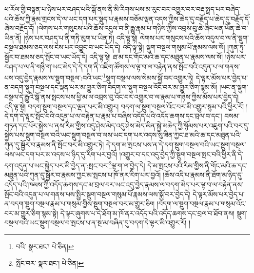 ཕ་རོལ་གྱི་བསྟན་པ་ཉེས་པར་བཤད་པའི་སྒོ་ནས་ནི་མི་རིགས་པས་མ་རུང་བར་འགྱུར་བར་བརྡ་སྤྲད་པར་བཞེད་པའི་ཆོས་ཀྱི་རྣམ་གྲངས་དེ་ལ་ཡང་དག་པར་སྡུད་པ་རྣམས་བཅོམ་ལྡན་འདས་ཀྱིས་ཆེད་དུ་བརྗོད་པ་ཆེད་དུ་བརྗོད་དོ་ཞེས་བརྗོད་དོ། །ལེགས་པར་གསུངས་པའི་ཆོས་འདུལ་བ་ནི་རྒྱུ་རྣམ་པ་གཉིས་ཀྱིས་འབྲས་བུ་ཆེ་ཞིང་ཕན་ཡོན་ཆེ་བ་ཡིན་ནོ། །ཉེས་པར་བཤད་པ་ནི་གཏི་མུག་པ་ཡིན་ཏེ། འདི་ལྟ་སྟེ། ལེགས་པར་གསུངས་པའི་ཆོས་འདུལ་བ་ལ་ནི་སྡུག་བསྔལ་ཐམས་ཅད་ལས་ངེས་པར་འབྱུང་བ་ཡང་ཡོད་དེ། འདི་ལྟ་སྟེ། སྡུག་བསྔལ་གསུམ་པོ་རྣམས་ལས་སོ། །ཀུན་ཏུ་སྦྱོར་བ་ཐམས་ཅད་སྤོང་བ་ཡང་ཡོད་དེ། འདི་ལྟ་སྟེ། ཐ་མ་དང་གོང་མའི་ཆ་དང་མཐུན་པ་རྣམས་ལས་སོ། །ཉེས་པར་བཤད་པ་ལ་ནི་གཉི་ག་ཡང་མེད་དེ་དེ་དག་ནི་འཇིག་ཚོགས་ལ་ལྟ་བ་ལ་བརྟེན་ནས་སྤོང་བའི་འདུན་པ་ལ་གནས་པས་འདུ་བྱེད་རྣམས་ལ་སྡུག་བསྔལ་:བའི་ཡང་\footnote{བའི་  སྣར་ཐང་།  པེ་ཅིན། }སྡུག་བསྔལ་ལས་སེམས་སྐྱོ་བར་འགྱུར་ཏེ། དེ་ལྟར་མོས་པར་བྱེད་པ་ན་བདག་སྡུག་བསྔལ་དང་ལྡན་པར་མ་གྱུར་ཅིག་བདག་ལ་སྡུག་བསྔལ་འོང་བར་མ་གྱུར་ཅིག་སྙམ་མོ། །ཡང་ན་སྡུག་བསྔལ་དེ་རྒྱུའི་སྒོ་ནས་སྤངས་པས་ཕྱི་མ་ལ་འབྲས་བུ་འོང་བར་འགྱུར་བ་ལ་རྣམ་པ་གཉིས་ཀྱིས་མོས་པར་བྱེད་དེ། འདི་ལྟ་སྟེ། བདག་སྡུག་བསྔལ་དང་ལྡན་པར་མི་འགྱུར། བདག་ལ་སྡུག་བསྔལ་འོང་བར་མི་འགྱུར་སྙམ་པའི་ཕྱིར་རོ། །དེ་དག་དེ་ལྟར་སྤོང་བའི་འདུན་པ་ལ་བརྟེན་པ་རྣམ་པ་བཞིས་འདོད་པའི་འདོད་ཆགས་དང་བྲལ་བ་དང་། བསམ་གཏན་དང་པོར་སྐྱེས་པ་ནས་རིམ་གྱིས་འདུ་ཤེས་མེད་འདུ་ཤེས་མེད་མིན་སྐྱེ་མཆེད་ཀྱི་སྙོམས་པར་འཇུག་པའི་བར་དུ་སྐྱེས་པས་སྡུག་བསྔལ་བའི་ཡང་སྡུག་བསྔལ་བ་ལས་ཡང་དག་པར་འདས་སུ་ཟིན་ཀྱང་ཐ་མའི་ཆ་དང་མཐུན་པའི་ཀུན་དུ་སྦྱོར་བ་རྣམས་ནི་སྤོང་བར་མི་འགྱུར་ཏེ། དེ་དག་མ་སྤངས་པས་ན་དེ་དག་སྡུག་བསྔལ་བའི་ཡང་སྡུག་བསྔལ་ལས་ཡང་དག་པར་མ་འདས་པ་ཉིད་དུ་རིག་པར་བྱའོ། །འགྱུར་བ་དང་འདུ་བྱེད་ཀྱི་སྡུག་བསྔལ་སྤང་བའི་ཕྱིར་ནི་དེ་དག་འདུན་པ་ཡང་སྐྱེད་པར་མི་བྱེད་ན་:སྤང་བར་\footnote{སྤོང་བར་  སྣར་ཐང་།  པེ་ཅིན། }ལྟ་ག་ལ་བྱེད་དེ། དེ་མ་སྤངས་པའི་རིམ་གྱིས་ནི་གོང་མའི་ཆ་དང་མཐུན་པའི་ཀུན་དུ་སྦྱོར་བ་རྣམས་ཀྱང་མ་སྤངས་པ་ཁོ་ནར་རིག་པར་བྱའོ། །ཆོས་འདི་པ་རྣམས་ནི་ཐོག་མ་ཉིད་དུ་འདོད་པའི་ཁམས་ཀྱི་འདོད་ཆགས་དང་མ་བྲལ་བར་ཡང་འདུ་བྱེད་རྣམས་ལ་བདག་མེད་པར་ལྟ་བ་ལ་བརྟེན་ནས་སྤོང་བའི་འདུན་པ་ལ་གནས་པས་སྤྱིར་སྡུག་བསྔལ་གསུམ་པོ་རྣམས་ལས་སྐྱོ་བར་བྱེད་དེ། དེ་ལྟར་མོས་པར་བྱེད་པ་ན་བདག་སྡུག་བསྔལ་རྣམ་པ་གསུམ་གྱིས་སྡུག་བསྔལ་བར་མ་གྱུར་ཅིག །བདག་ལ་སྡུག་བསྔལ་རྣམ་པ་གསུམ་འོང་བར་མ་གྱུར་ཅིག་སྙམ་སྟེ། དེ་ལྟར་ཞུགས་པ་དེ་ཐོག་མ་ཁོ་ནར་འདོད་པའི་འདོད་ཆགས་དང་བྲལ་བ་ཐོབ་ནས། སྡུག་བསྔལ་བའི་ཡང་སྡུག་བསྔལ་བ་སྤངས་པ་ན་སྔ་མ་བཞིན་དུ་བདག་དེ་ལྟར་མི་འགྱུར་རོ། །
